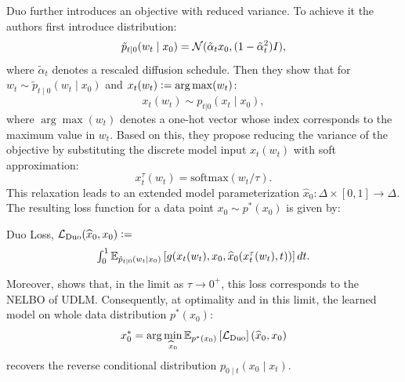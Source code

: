   Duo further introduces an objective with reduced variance. To achieve it the authors first introduce distribution:
  \begin{equation}
    \tilde{p}_{t\mid 0}(w_t \mid x_0) = \mathcal{N}(\tilde{\alpha}_t x_0, (1-\tilde{\alpha}_t^2)I), \nonumber
  \end{equation}
  where $\tilde{\alpha}_t$ denotes a rescaled diffusion schedule. Then they show that for $w_t \sim \tilde{p}_{t\mid 0}(w_t \mid x_0)$ and $x_t(w_t) \vcentcolon= \arg\max(w_t)$:
  \[
    x_t(w_t) \sim p_{t|0}(x_t \mid x_0), 
  \]
  where $\arg\max(w_t)$ denotes a one-hot vector whose index corresponds to the maximum value in $w_t$. Based on this, they propose reducing the variance of the objective by substituting the discrete model input $x_t(w_t)$ with soft approximation:
  \begin{equation}
    x^{\tau}_{t}(w_t) = \mathrm{softmax}\left({w_t}/{\tau}\right). \nonumber
  \end{equation} 
  This relaxation leads to an extended model parameterization $\widehat{x}_0 \colon \Delta \times [0, 1] \to \Delta$. The resulting loss function for a data point $x_0 \sim p^*(x_0)$ is given by:
  \begin{Box1}{Duo Loss, $\mathcal{L}_{\text{Duo}}(\widehat{x}_0, x_0) \vcentcolon=$}
    \vspace{-8pt}
    \begin{gather}
    \label{eq:duo loss}
      \textstyle \int_0^1 \mathbb{E}_{\tilde{p}_{t\mid 0}(w_t\mid x_0)} \left[g(x_t(w_t),x_0, \widehat{x}_0(x_t^{\tau}(w_t), t))\right]dt.
    \end{gather}
  \end{Box1}
  Moreover, \citet{sahoo2025the} shows that, in the limit as $\tau \to 0^{+}$, this loss corresponds to the NELBO of UDLM. Consequently, at optimality and in this limit, the learned model on whole data distribution $p^*(x_0)$:
  \[
    x_0^* = \arg\min_{\widehat{x}_0} \mathbb{E}_{p^*(x_0)}\left[\mathcal{L}_{\text{Duo}}\right](\widehat{x}_0, x_0)
  \]
  recovers the reverse conditional distribution $p_{0\mid t}(x_0 \mid x_t).$
  
